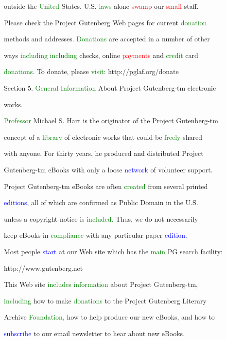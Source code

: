  outside the \textcolor{green}{United} States. U.S. \textcolor{green}{laws} alone \textcolor{red}{swamp} our \textcolor{red}{small} staff.



 Please check the Project Gutenberg Web pages for current \textcolor{green}{donation}

 methods and addresses. \textcolor{green}{Donations} are accepted in a number of other

 ways \textcolor{green}{including} \textcolor{green}{including} checks, online \textcolor{red}{payments} and \textcolor{green}{credit} card

 \textcolor{green}{donations.} To donate, please \textcolor{green}{visit:} http://pglaf.org/donate





 Section 5. \textcolor{green}{General} \textcolor{green}{Information} About Project Gutenberg-tm electronic

 works.



 \textcolor{green}{Professor} Michael S. Hart is the originator of the Project Gutenberg-tm

 concept of a \textcolor{green}{library} of electronic works that could be \textcolor{green}{freely} \textcolor{BurntOrange}{shared}

 with anyone. For thirty years, he produced and distributed Project

 Gutenberg-tm eBooks with only a loose \textcolor{blue}{network} of \textcolor{BurntOrange}{volunteer} support.





 Project Gutenberg-tm eBooks are often \textcolor{green}{created} from several printed

 \textcolor{blue}{editions,} all of which are confirmed as \textcolor{BurntOrange}{Public} Domain in the U.S.

 unless a copyright notice is \textcolor{green}{included.} Thus, we do not necessarily

 keep eBooks in \textcolor{green}{compliance} with any particular paper \textcolor{blue}{edition.}





 Most people \textcolor{blue}{start} at our Web site which has the \textcolor{green}{main} PG search facility:



 http://www.gutenberg.net



 This Web site \textcolor{green}{includes} \textcolor{green}{information} about Project Gutenberg-tm,

 \textcolor{green}{including} how to make \textcolor{green}{donations} to the Project Gutenberg Literary

 Archive \textcolor{green}{Foundation,} how to help produce our new eBooks, and how to

 \textcolor{blue}{subscribe} to our email newsletter to hear about new eBooks.



